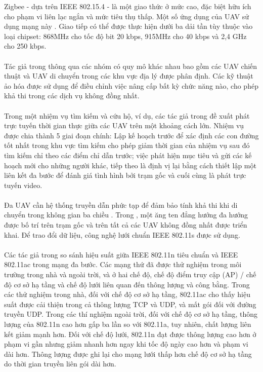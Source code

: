 \documentclass[11pt,openany]{book}
\begin{document}
Zigbee - dựa trên IEEE 802.15.4 - là một giao thức ở mức cao, đặc biệt hữu ích cho phạm vi liên lạc ngắn và mức tiêu thụ thấp. Một số ứng dụng của UAV sử dụng mạng này \cite{asadpour2014routing}. Giao tiếp có thể được thực hiện dưới ba dải tần tùy thuộc vào loại chipset: 868MHz cho tốc độ bit 20 kbps, 915MHz cho 40 kbps và 2,4 GHz cho 250 kbps.\\\\
Tác giả trong \cite{vidal2015multi} thông qua các nhóm có quy mô khác nhau bao gồm các UAV chiến thuật và UAV di chuyển trong các khu vực địa lý được phân định. Các kỹ thuật ảo hóa được sử dụng để điều chỉnh việc nâng cấp bất kỳ chức năng nào, cho phép khả thi trong các dịch vụ không đồng nhất.\\\\
Trong một nhiệm vụ tìm kiếm và cứu hộ, ví dụ, các tác giả trong \cite{scherer2015autonomous} đề xuất phát trực tuyến thời gian thực giữa các UAV trên một khoảng cách lớn. Nhiệm vụ được chia thành 5 giai đoạn chính: Lập kế hoạch trước để xác định các con đường tốt nhất trong khu vực tìm kiếm cho phép giảm thời gian của nhiệm vụ sau đó tìm kiếm chỉ theo các điểm chỉ dẫn trước; việc phát hiện mục tiêu và gửi các kế hoạch mới cho những người khác, tiếp theo là định vị lại bằng cách thiết lập một liên kết đa bước để đánh giá tình hình bởi trạm gốc và cuối cùng là phát trực tuyến video.\\\\
Đa UAV cần hệ thống truyền dẫn phức tạp để đảm bảo tính khả thi khi di chuyển trong không gian ba chiều . Trong \cite{scherer2015autonomous}, một ăng ten đẳng hướng đa hướng được bố trí trên trạm gốc và trên tất cả các UAV không đồng nhất được triển khai. Để trao đổi dữ liệu, công nghệ lưới chuẩn IEEE 802.11s được sử dụng.\\\\
Các tác giả trong \cite{hayat2015experimental} so sánh hiệu suất giữa IEEE 802.11n tiêu chuẩn và IEEE 802.11ac trong mạng đa bước. Các mạng thứ đã được thử nghiệm trong môi trường trong nhà và ngoài trời, và ở hai chế độ, chế độ điểm truy cập (AP) / chế độ cơ sở hạ tầng và chế độ lưới liên quan đến thông lượng và công bằng. Trong các thử nghiệm trong nhà, đối với chế độ cơ sở hạ tầng, 802.11ac cho thấy hiệu suất được cải thiện trong cả thông lượng TCP và UDP, và mất gói đối với đường truyền UDP. Trong các thí nghiệm ngoài trời, đối với chế độ cơ sở hạ tầng, thông lượng của 802.11n cao hơn gấp ba lần so với 802.11a, tuy nhiên, chất lượng liên kết giảm mạnh hơn. Đối với chế độ lưới, 802.11n đạt được thông lượng cao hơn ở phạm vi gần nhưng giảm nhanh hơn ngay khi tốc độ ngày cao hơn và phạm vi dài hơn. Thông lượng được ghi lại cho mạng lưới thấp hơn chế độ cơ sở hạ tầng do thời gian truyền liên gói dài hơn.\\\\
\end{document}
